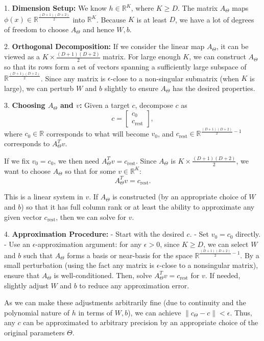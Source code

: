 1. \textbf{Dimension Setup:} We know $h \in \mathbb{R}^K$, where $K \geq D$. The matrix $A_{\Theta}$ maps $\phi(x) \in \mathbb{R}^{\frac{(D+1)(D+2)}{2}}$ into $\mathbb{R}^K$. Because $K$ is at least $D$, we have a lot of degrees of freedom to choose $A_{\Theta}$ and hence $W, b$.

2. \textbf{Orthogonal Decomposition:} If we consider the linear map $A_{\Theta}$, it can be viewed as a $K \times \frac{(D+1)(D+2)}{2}$ matrix. For large enough $K$, we can construct $A_{\Theta}$ so that its rows form a set of vectors spanning a sufficiently large subspace of $\mathbb{R}^{\frac{(D+1)(D+2)}{2}}$. Since any matrix is $\epsilon$-close to a non-singular submatrix (when $K$ is large), we can perturb $W$ and $b$ slightly to ensure $A_{\Theta}$ has the desired properties.

3. \textbf{Choosing $A_{\Theta}$ and $v$:} Given a target $c$, decompose $c$ as 
\[
c = \begin{bmatrix} c_0 \\ c_{\text{rest}} \end{bmatrix},
\]
where $c_0 \in \mathbb{R}$ corresponds to what will become $v_0$, and $c_{\text{rest}} \in \mathbb{R}^{\frac{(D+1)(D+2)}{2}-1}$ corresponds to $A_{\Theta}^T v$.

If we fix $v_0 = c_0$, we then need $A_{\Theta}^T v = c_{\text{rest}}$. Since $A_{\Theta}$ is $K \times \frac{(D+1)(D+2)}{2}$, we want to choose $A_{\Theta}$ so that for some $v \in \mathbb{R}^{K}$:
\[
A_{\Theta}^T v = c_{\text{rest}}.
\]

This is a linear system in $v$. If $A_{\Theta}$ is constructed (by an appropriate choice of $W$ and $b$) so that it has full column rank or at least the ability to approximate any given vector $c_{\text{rest}}$, then we can solve for $v$. 

4. \textbf{Approximation Procedure:}
   - Start with the desired $c$.
   - Set $v_0 = c_0$ directly.
   - Use an $\epsilon$-approximation argument: for any $\epsilon > 0$, since $K \ge D$, we can select $W$ and $b$ such that $A_{\Theta}$ forms a basis or near-basis for the space $\mathbb{R}^{\frac{(D+1)(D+2)}{2}-1}$. By a small perturbation (using the fact any matrix is $\epsilon$-close to a nonsingular matrix), ensure that $A_{\Theta}$ is well-conditioned. Then, solve $A_{\Theta}^T v = c_{\text{rest}}$ for $v$. If needed, slightly adjust $W$ and $b$ to reduce any approximation error.

As we can make these adjustments arbitrarily fine (due to continuity and the polynomial nature of $h$ in terms of $W,b$), we can achieve $\|c_{\Theta} - c\| < \epsilon$. Thus, any $c$ can be approximated to arbitrary precision by an appropriate choice of the original parameters $\Theta$.

